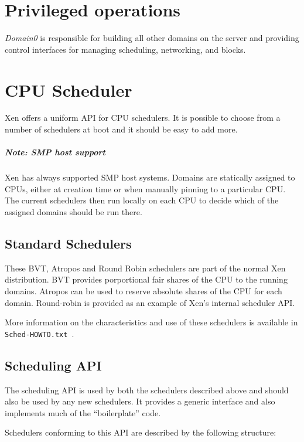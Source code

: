\documentclass[11pt,twoside,final,openright]{xenstyle}
\begin{document}

\chapter{Privileged operations}
{\it Domain0} is responsible for building all other domains on the server
and providing control interfaces for managing scheduling, networking, and
blocks.

\chapter{CPU Scheduler}

Xen offers a uniform API for CPU schedulers.  It is possible to choose
from a number of schedulers at boot and it should be easy to add more.

\paragraph*{Note: SMP host support}
Xen has always supported SMP host systems.  Domains are statically assigned to
CPUs, either at creation time or when manually pinning to a particular CPU.
The current schedulers then run locally on each CPU to decide which of the
assigned domains should be run there.

\section{Standard Schedulers}

These BVT, Atropos and Round Robin schedulers are part of the normal
Xen distribution.  BVT provides porportional fair shares of the CPU to
the running domains.  Atropos can be used to reserve absolute shares
of the CPU for each domain.  Round-robin is provided as an example of
Xen's internal scheduler API.

More information on the characteristics and use of these schedulers is
available in { \tt Sched-HOWTO.txt }.

\section{Scheduling API}

The scheduling API is used by both the schedulers described above and should
also be used by any new schedulers.  It provides a generic interface and also
implements much of the ``boilerplate'' code.

Schedulers conforming to this API are described by the following
structure:
\end{document}
